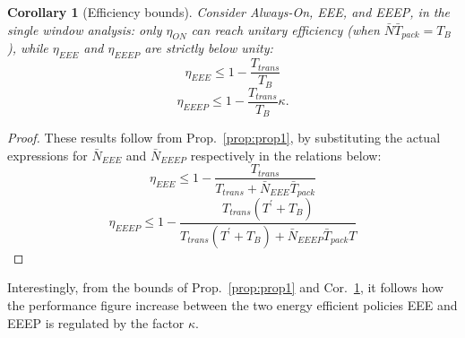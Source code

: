 \documentclass[journal,10pt,twoside,final]{IEEEtran}
\newtheorem{corollary}{Corollary}
\begin{document}
\begin{corollary} [Efficiency bounds] Consider Always-On, EEE, and EEEP, in the single window analysis: only $\eta_{ON}$ can reach unitary efficiency (when $\bar{N}\bar{T}_{pack}=T_B$), while $\eta_{EEE}$ and $\eta_{EEEP}$ are strictly below unity:
\begin{equation}
\eta_{EEE}\le 1-\frac{T_{trans}}{T_{B}}
\label{eq:EEEbound}
\end{equation}
\begin{equation}
\eta_{EEEP} \le 1-\frac{T_{trans}}{T_B}\kappa.
\label{eq:EEEPbound}
\end{equation}
\label{prop:cor1}
\end{corollary}
\begin{proof}
These results follow from Prop.~\ref{prop:prop1}, by substituting the actual expressions for ${\bar{N}_{EEE}}$ and ${\bar{N}_{EEEP}}$ respectively in the relations below:
\begin{equation}
\eta_{EEE}\le 1-\frac{T_{trans}}{T_{trans}+{\bar{N}_{EEE}} \bar{T}_{pack}}
\label{eq:EEEbound0}
\end{equation}
\begin{equation}
\eta_{EEEP} \le 1-\frac{T_{trans}\left(T^\prime+T_B\right)}{T_{trans}\left(T^\prime+T_B\right) + \bar{N}_{EEEP} \bar{T}_{pack} T}
\label{eq:EEEPbound20}
\end{equation}
\end{proof}


Interestingly, from the bounds of Prop.~\ref{prop:prop1} and Cor.~\ref{prop:cor1}, it follows how the performance figure increase between the two energy efficient policies EEE and EEEP is regulated by the factor $\kappa$.
\end{document}
